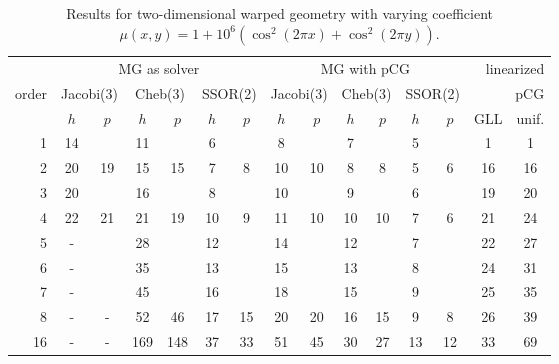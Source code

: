 \documentclass[smallcondensed,final]{svjour3}     %
\begin{document}
\begin{table}
  \caption{\label{tab:2d-fan} Results for two-dimensional warped geometry
    with varying coefficient $\mu(x,y) = 1 + 10^6(\cos^2(2\pi x) + \cos^2(2\pi y))$.}
  \centering
  \begin{tabular}{|r|c c|c c|c c||c c|c c|c c||c c|} 
    \hline
    & \multicolumn{6}{c||}{MG as solver} & \multicolumn{6}{c||}{MG with pCG} & \multicolumn{2}{r|}{linearized} \\
    \cline{2-13}
    \!\!\! order \!\!\!\! &  \multicolumn{2}{c|}{\!\scriptsize  Jacobi(3)\!} &  \multicolumn{2}{c|}{\!\scriptsize Cheb(3)\!} & \multicolumn{2}{c||}{\!\scriptsize  SSOR(2)\!} & \multicolumn{2}{c|}{\!\scriptsize Jacobi(3)\!} &  \multicolumn{2}{c|}{\!\scriptsize Cheb(3)\!} & \multicolumn{2}{c||}{\!\scriptsize SSOR(2)\!} & \multicolumn{2}{r|}{pCG}\\
\hline
 & $h$ & $p$ & $h$ & $p$& $h$ & $p$& $h$ & $p$& $h$ & $p$& $h$ & $p$& GLL & unif.\\
 \cline{2-15}
1 & 14 & & 11 & & 6 & & 8 & & 7 & & 5 & & 1 & 1  \\
2 & 20 & 19 & 15 & 15 & 7 & 8 & 10 & 10 & 8 & 8 & 5 & 6 & 16 & 16 \\
3 & 20 & & 16 & & 8 & & 10 & & 9 & & 6 & & 19 & 20  \\
4 & 22 & 21 & 21 & 19 & 10 & 9 & 11 & 10 & 10 & 10 & 7 & 6 & 21 & 24 \\
5 & -  & & 28 & & 12 & & 14 & & 12 & & 7 & & 22 & 27  \\
6 & -  & & 35 & & 13 & & 15 & & 13 & & 8 & & 24 & 31  \\
7 & -  & & 45 & & 16 & & 18 & & 15 & & 9 & & 25 & 35  \\
8 & -  & - & 52 & 46 & 17 & 15 & 20 & 20 & 16 & 15 & 9 & 8 & 26 & 39 \\
16 & - & - & 169 & 148 & 37 & 33 & 51 & 45 & 30 & 27 & 13 & 12 & 33 & 69 \\
\hline
  \end{tabular}
\end{table}
\end{document}
